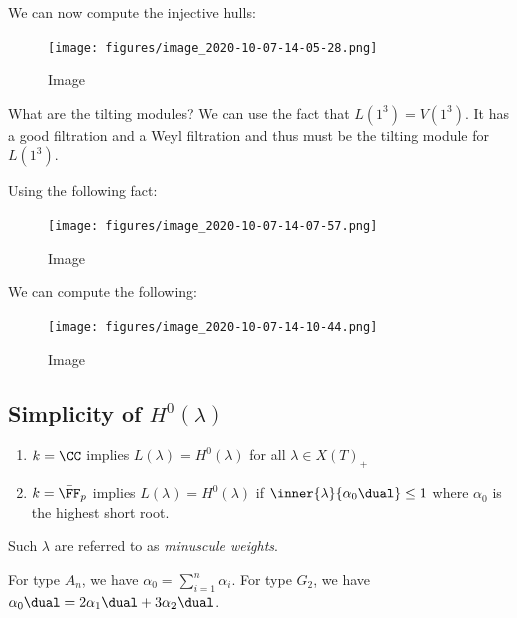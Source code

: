 \begin{example}
We can now compute the injective hulls:

\begin{figure}
\centering
\texttt{[image: figures/image\_2020-10-07-14-05-28.png]}
\caption{Image}
\end{figure}

What are the tilting modules? We can use the fact that
\(L(1^3) = V(1^3)\). It has a good filtration and a Weyl filtration and
thus must be the tilting module for \(L(1^3)\).

Using the following fact:

\begin{figure}
\centering
\texttt{[image: figures/image\_2020-10-07-14-07-57.png]}
\caption{Image}
\end{figure}

We can compute the following:

\begin{figure}
\centering
\texttt{[image: figures/image\_2020-10-07-14-10-44.png]}
\caption{Image}
\end{figure}

\end{example}

\hypertarget{simplicity-of-h0lambda}{%
\subsection{\texorpdfstring{Simplicity of
\(H^0(\lambda)\)}{Simplicity of H\^{}0(\textbackslash lambda)}}\label{simplicity-of-h0lambda}}

\begin{enumerate}
\def\labelenumi{\arabic{enumi}.}
\item
  \(k = \CC\) implies \(L(\lambda) = H^0(\lambda)\) for all
  \(\lambda \in X(T)_+\)
\item
  \(k= \bar{\FF}_p\) implies \(L(\lambda) = H^0(\lambda)\) if
  \(\inner{\lambda}{\alpha_0\dual} \leq 1\) where \(\alpha_0\) is the
  highest short root.
\end{enumerate}

Such \(\lambda\) are referred to as \emph{minuscule weights}.

\begin{example}

For type \(A_n\), we have \(\alpha_0 = \sum_{i=1}^n \alpha_i\). For type
\(G_2\), we have \(\alpha_0\dual = 2\alpha_1\dual + 3\alpha_2\dual\).

\end{example}

